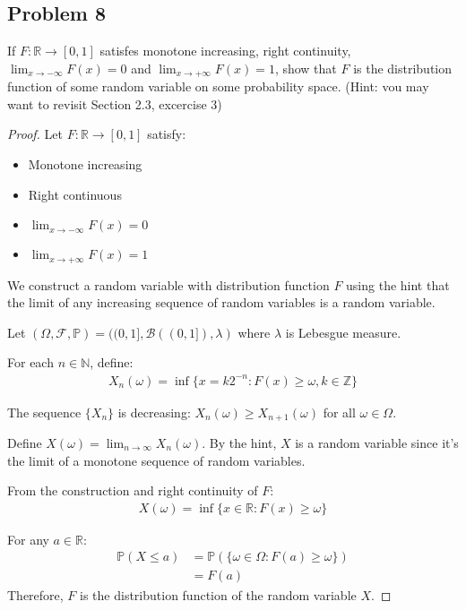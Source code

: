 \documentclass[letterpaper, 11pt]{article}
\newcommand{\1}{\mathds{1}}	%
\theoremstyle{definition}
\begin{document}
\subsection*{Problem 8}
If $F: \mathbb{R} \to [ 0, 1]$ satisfes monotone increasing, right continuity, $\lim _{x\to - \infty }F( x) = 0$ and $\lim_{x\to+\infty}F(x)=1$, show that $F$ is the distribution function of some random variable on some probability space. (Hint: vou may want to revisit Section 2.3, excercise 3)
\begin{proof}
    Let $F: \mathbb{R} \to [0, 1]$ satisfy:
\begin{itemize}
    \item Monotone increasing
    \item Right continuous
    \item $\lim_{x \to -\infty} F(x) = 0$
    \item $\lim_{x \to +\infty} F(x) = 1$
\end{itemize}

We construct a random variable with distribution function $F$ using the hint that the limit of any increasing sequence of random variables is a random variable.

Let $(\Omega, \mathcal{F}, \mathbb{P}) = ((0,1], \mathcal{B}((0,1]), \lambda)$ where $\lambda$ is Lebesgue measure.

For each $n \in \mathbb{N}$, define:
\begin{align*}
X_n(\omega) = \inf\{x = k2^{-n} : F(x) \geq \omega, k \in \mathbb{Z}\}
\end{align*}

The sequence $\{X_n\}$ is decreasing: $X_n(\omega) \geq X_{n+1}(\omega)$ for all $\omega \in \Omega$.

Define $X(\omega) = \lim_{n \to \infty} X_n(\omega)$. By the hint, $X$ is a random variable since it's the limit of a monotone sequence of random variables.

From the construction and right continuity of $F$:
\begin{align*}
X(\omega) = \inf\{x \in \mathbb{R} : F(x) \geq \omega\}
\end{align*}

For any $a \in \mathbb{R}$:
\begin{align*}
\mathbb{P}(X \leq a) &= \mathbb{P}(\{\omega \in \Omega : F(a) \geq \omega\}) \\
&= F(a)
\end{align*}
Therefore, $F$ is the distribution function of the random variable $X$.
    \end{proof}
\end{document}
